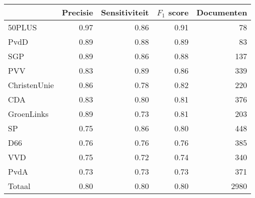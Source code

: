 \begin{tabular}{lrrrr}
\toprule
{} &  Precisie &  Sensitiviteit &  $F_1$ score &  Documenten \\
\midrule
50PLUS       &       0.97 &    0.86 &      0.91 &          78 \\
PvdD         &       0.89 &    0.88 &      0.89 &          83 \\
SGP          &       0.89 &    0.86 &      0.88 &         137 \\
PVV          &       0.83 &    0.89 &      0.86 &         339 \\
ChristenUnie &       0.86 &    0.78 &      0.82 &         220 \\
CDA          &       0.83 &    0.80 &      0.81 &         376 \\
GroenLinks   &       0.89 &    0.73 &      0.81 &         203 \\
SP           &       0.75 &    0.86 &      0.80 &         448 \\
D66          &       0.76 &    0.76 &      0.76 &         385 \\
VVD          &       0.75 &    0.72 &      0.74 &         340 \\
PvdA         &       0.73 &    0.73 &      0.73 &         371 \\
\midrule
Totaal       &       0.80 &    0.80 &      0.80 &        2980 \\
\bottomrule
\end{tabular}
